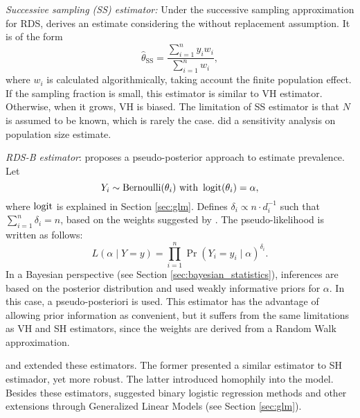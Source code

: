 \begin{alineas}
  \item {\em Successive sampling (SS) estimator:} Under the successive sampling
  approximation for RDS, \textcite[p. 137-138]{gile2011improved} derives an
  estimate considering the without replacement assumption. It is of the form 
  \begin{equation}
    \label{eq:successive-sampling-estimator}
    \hat{\theta}_{\mathrm{SS}} = \frac{\sum_{i=1}^n y_i w_i}{\sum_{i=1}^n w_i}, 
  \end{equation}
  where $w_i$ is calculated algorithmically, taking account the finite
  population effect. If the sampling fraction is small, this estimator is
  similar to VH estimator. Otherwise, when it grows, VH is biased. The
  limitation of SS estimator is that $N$ is assumed to be known, which is
  rarely the case. \textcite[p. 140]{gile2011improved} did a sensitivity
  analysis on population size estimate. 

  \item {\em RDS-B estimator}: \cite{bastos2018hiv} proposes a
  pseudo-posterior approach to estimate prevalence. Let 
  \begin{equation*}
    Y_i \sim \operatorname{Bernoulli}(\theta_i) \text{ with } \operatorname{logit}(\theta_i) = \alpha,
  \end{equation*}  
  where $\operatorname{logit}$ is explained in Section \ref{sec:glm}. Defines 
  $\delta_i \propto n \cdot d_i^{-1}$ such that $\sum_{i=1}^n \delta_i = n$,
  based on the weights suggested by \textcite{volz2008probability}. The
  pseudo-likelihood is written as follows: 
  \begin{equation*}
    L(\alpha \mid Y = y) = \prod_{i=1}^n \Pr(Y_i = y_i \mid \alpha)^{\delta_i}. 
  \end{equation*}
  In a Bayesian perspective (see Section \ref{sec:bayesian_statistics}), 
  inferences are based on the posterior distribution and 
  \textcite[p. S18]{bastos2018hiv} used weakly informative priors for
  $\alpha$. In this case, a pseudo-posteriori is used. This estimator has the
  advantage of allowing prior information as convenient, but it suffers from
  the same limitations as VH and SH estimators, since the weights are derived
  from a Random Walk approximation. 

\end{alineas}

\textcite{ott2019reduced} and \textcite{fellows2019respondent} extended these
estimators. The former presented
a similar estimator to SH estimador, yet more robust. The latter introduced
homophily into the model. Besides these estimators,
\textcite{avery2021statistical} suggested binary logistic
regression methods and other extensions through Generalized Linear Models (see
Section \ref{sec:glm}). 

